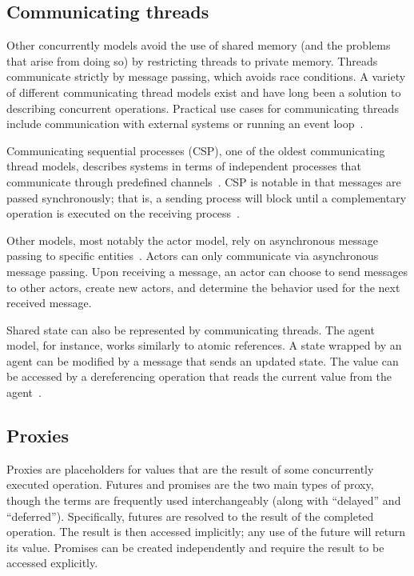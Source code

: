 \documentclass{sig-alternate}
\begin{document}
\subsection{Communicating threads}

Other concurrently models avoid the use of shared memory (and the problems that arise from doing so) by restricting threads to private memory. Threads communicate strictly by message passing, which avoids race conditions. A variety of different communicating thread models exist and have long been a solution to describing concurrent operations. Practical use cases for communicating threads include communication with external systems or running an event loop~\cite{Swalens2014}.

Communicating sequential processes (CSP), one of the oldest communicating thread models, describes systems in terms of independent processes that communicate through predefined channels~\cite{Hoare1978}. CSP is notable in that messages are passed synchronously; that is, a sending process will block until a complementary operation is executed on the receiving process~\cite{Swalens2014}.

Other models, most notably the actor model, rely on asynchronous message passing to specific entities~\cite{Agha1986}. Actors can only communicate via asynchronous message passing. Upon receiving a message, an actor can choose to send messages to other actors, create new actors, and determine the behavior used for the next received message.

Shared state can also be represented by communicating threads. The agent model, for instance, works similarly to atomic references. A state wrapped by an agent can be modified by a message that sends an updated state. The value can be accessed by a dereferencing operation that reads the current value from the agent~\cite{Swalens2014}.

\subsection{Proxies}

Proxies are placeholders for values that are the result of some concurrently executed operation. Futures and promises are the two main types of proxy, though the terms are frequently used interchangeably (along with ``delayed'' and ``deferred''). Specifically, futures are resolved to the result of the completed operation. The result is then accessed implicitly; any use of the future will return its value. Promises can be created independently and require the result to be accessed explicitly.
\end{document}
